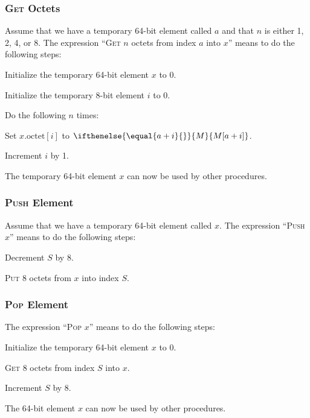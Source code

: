 \documentclass[a4paper,12pt]{article}
\newcommand{\MEM}[1]{\ifthenelse{\equal{#1}{}}{M}{M[#1]}}
\newcommand{\SP}{S}
\newcommand{\octno}[2]{#1.\mathrm{octet}[#2]}
\newcommand{\proc}[1]{\textsc{#1}}
\begin{document}
\subsubsection{\proc{Get} Octets}

Assume that we have a temporary 64-bit element called $a$ and that $n$ is either 1, 2, 4, or 8.
The expression ``\proc{Get} $n$ octets from index $a$ into $x$'' means to do the following steps:
\begin{stepnumbers}
\item Initialize the temporary 64-bit element $x$ to 0.
\item Initialize the temporary 8-bit element $i$ to 0.
\item Do the following $n$ times:
  \begin{stepletters}
  \item Set $\octno{x}{i}$ to $\MEM{a+i}$.
  \item Increment $i$ by 1.
  \end{stepletters}
\end{stepnumbers}
The temporary 64-bit element $x$ can now be used by other procedures.

\subsubsection{\proc{Push} Element}

Assume that we have a temporary 64-bit element called $x$.
The expression ``\proc{Push} $x$'' means to do the following steps:
\begin{stepnumbers}
\item Decrement $\SP$ by 8.
\item \proc{Put} 8 octets from $x$ into index $\SP$.
\end{stepnumbers}

\subsubsection{\proc{Pop} Element}

The expression ``\proc{Pop} $x$'' means to do the following steps:
\begin{stepnumbers}
\item Initialize the temporary 64-bit element $x$ to 0.
\item \proc{Get} 8 octets from index $\SP$ into $x$.
\item Increment $\SP$ by 8.
\end{stepnumbers}
The 64-bit element $x$ can now be used by other procedures.
\end{document}
